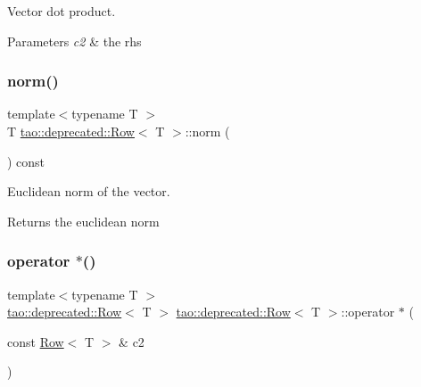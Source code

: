 Vector dot product. 


\begin{DoxyParams}{Parameters}
{\em c2} & the rhs \\
\hline
\end{DoxyParams}
\mbox{\label{classtao_1_1deprecated_1_1_row_aee5789eadcc7de529f38226e2f959d1c}} 
\subsubsection{\texorpdfstring{norm()}{norm()}}
{\footnotesize\ttfamily template$<$typename T $>$ \\
T \mbox{\hyperlink{classtao_1_1deprecated_1_1_row}{tao\+::deprecated\+::\+Row}}$<$ T $>$\+::norm (\begin{DoxyParamCaption}{ }\end{DoxyParamCaption}) const}



Euclidean norm of the vector. 

\begin{DoxyReturn}{Returns}
the euclidean norm 
\end{DoxyReturn}
\mbox{\label{classtao_1_1deprecated_1_1_row_ab35fdd6c34ca76bcb89a1510fea7eac2}} 
\subsubsection{\texorpdfstring{operator $\ast$()}{operator *()}}
{\footnotesize\ttfamily template$<$typename T $>$ \\
\mbox{\hyperlink{classtao_1_1deprecated_1_1_row}{tao\+::deprecated\+::\+Row}}$<$ T $>$ \mbox{\hyperlink{classtao_1_1deprecated_1_1_row}{tao\+::deprecated\+::\+Row}}$<$ T $>$\+::operator $\ast$ (\begin{DoxyParamCaption}\item[{const \mbox{\hyperlink{classtao_1_1deprecated_1_1_row}{Row}}$<$ T $>$ \&}]{c2 }\end{DoxyParamCaption})}




